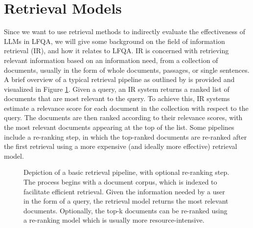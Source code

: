 \section{Retrieval Models}\label{sec:retrieval-models}
Since we want to use retrieval methods to indirectly evaluate the effectiveness of LLMs in LFQA, we will give some background on the field of information retrieval (IR), and how it relates to LFQA.
IR is concerned with retrieving relevant information based on an information need, from a collection of documents, usually in the form of whole documents, passages, or single sentences.
A brief overview of a typical retrieval pipeline as outlined by \cite{manning:2009:An} is provided and visualized in Figure \ref{fig:reranking_pipeline}.
Given a query, an IR system returns a ranked list of documents that are most relevant to the query.
To achieve this, IR systems estimate a relevance score for each document in the collection with respect to the query.
The documents are then ranked according to their relevance scores, with the most relevant documents appearing at the top of the list.
Some pipelines include a re-ranking step, in which the top-ranked documents are re-ranked after the first retrieval using a more expensive (and ideally more effective) retrieval model.
\begin{figure}[tb]
\centering
{}
\caption{Depiction of a basic retrieval pipeline, with optional re-ranking step. The process begins with a document corpus, which is indexed to facilitate efficient retrieval. Given the information needed by a user in the form of a query, the retrieval model returns the most relevant documents. Optionally, the top-k documents can be re-ranked using a re-ranking model which is usually more resource-intensive.}
\label{fig:reranking_pipeline}
\end{figure}

